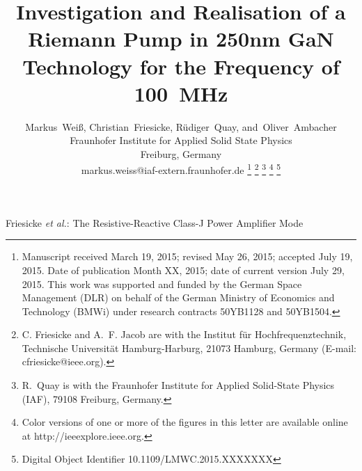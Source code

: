 \documentclass[journal]{IEEEtran}
\begin{document}
\title{Investigation and Realisation of a Riemann Pump in 250nm GaN Technology for the Frequency of \SI{100}{\MHz}}

\author{%
	Markus~Wei\ss{},
    Christian~Friesicke,
    R\"{u}diger~Quay,
    and~Oliver~Ambacher\\
    Fraunhofer Institute for Applied Solid State Physics\\
    Freiburg, Germany\\
    markus.weiss@iaf-extern.fraunhofer.de%
    \thanks{%
      Manuscript received March 19, 2015;
      revised May 26, 2015;
      accepted July 19, 2015.
      Date of publication Month XX, 2015;
      date of current version July 29, 2015.
      This work was supported and funded by the German Space Management
      (DLR) on behalf of the German Ministry of Economics and Technology (BMWi)
      under research contracts 50YB1128 and 50YB1504.%
    }%
    \thanks{
      C. Friesicke and A.~F. Jacob are with the Institut f\"{u}r
      Hochfrequenztechnik, Technische Universit\"{a}t Hamburg-Harburg, 21073
      Hamburg, Germany (E-mail: cfriesicke@ieee.org).%
    }%
    \thanks{R.~Quay is with the Fraunhofer Institute for Applied Solid-State
      Physics (IAF), 79108 Freiburg, Germany.%
    }%
    \thanks{%
      Color versions of one or more of the figures in this letter are available
      online at http://ieeexplore.ieee.org.}
    \thanks{%
      Digital Object Identifier 10.1109/LMWC.2015.XXXXXXX%
    }%
}

%
         {Friesicke \MakeLowercase{\textit{et al.}}:
          The Resistive-Reactive Class-J Power Amplifier Mode}

\maketitle


\end{document}
